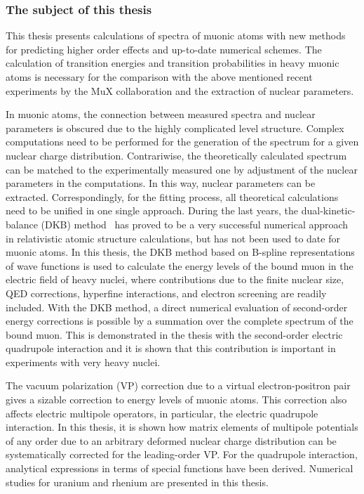 \subsubsection*{The subject of this thesis}

This thesis presents calculations of spectra of muonic atoms with new methods for predicting higher order effects and up-to-date numerical schemes. 
The calculation of transition energies and transition probabilities in heavy muonic atoms is necessary for the comparison with the above mentioned recent experiments by the MuX collaboration and the extraction of nuclear parameters.

In muonic atoms, the connection between measured spectra and nuclear parameters is obscured due to the highly complicated level structure. Complex computations need to be performed for the generation of the spectrum for a given nuclear charge distribution. Contrariwise, the theoretically calculated spectrum can be matched to the experimentally measured one by adjustment of the nuclear parameters in the computations. In this way, nuclear parameters can be extracted. Correspondingly, for the fitting process, all theoretical calculations need to be unified in one single approach. 
During the last years, the dual-kinetic-balance (DKB) method~\cite{Shabaev2004} has proved to be a very successful numerical approach in relativistic atomic structure calculations, but has not been used to date for muonic atoms.
In this thesis, the DKB method based on B-spline representations of wave functions is used to calculate the energy levels of the bound muon in the electric field of heavy nuclei, where contributions due to the finite nuclear size, QED corrections, hyperfine interactions, and electron screening are readily included.
With the DKB method, a direct numerical evaluation of second-order energy corrections is possible by a summation over the complete spectrum of the bound muon. This is demonstrated in the thesis with the second-order electric quadrupole interaction and it is shown that this contribution is important in experiments with very heavy nuclei.

The vacuum polarization (VP) correction due to a virtual electron-positron pair gives a sizable correction to energy levels of muonic atoms. This correction also affects electric multipole operators, in particular, the electric quadrupole interaction. In this thesis, it is shown how matrix elements of multipole potentials of any order due to an arbitrary deformed nuclear charge distribution can be systematically corrected for the leading-order VP. For the quadrupole interaction, analytical expressions in terms of special functions have been derived.  Numerical studies for uranium and rhenium are presented in this thesis.

